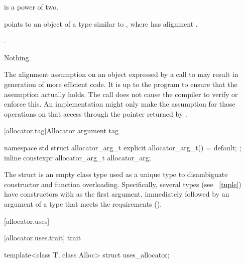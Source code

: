 \begin{itemdescr}
\pnum
\mandates
{} is a power of two.

\pnum
\expects
{} points to an object  of
a type similar to ,
where  has alignment .

\pnum
\returns
{}.

\pnum
\throws
Nothing.

\pnum
\begin{note}
The alignment assumption on an object 
expressed by a call to 
may result in generation of more efficient code.
It is up to the program to ensure that the assumption actually holds.
The call does not cause the compiler to verify or enforce this.
An implementation might only make the assumption
for those operations on  that access 
through the pointer returned by .
\end{note}
\end{itemdescr}

[allocator.tag]{Allocator argument tag}

%
%
\begin{itemdecl}
namespace std {
  struct allocator_arg_t { explicit allocator_arg_t() = default; };
  inline constexpr allocator_arg_t allocator_arg{};
}
\end{itemdecl}

\pnum
The  struct is an empty class type used as a unique type to
disambiguate constructor and function overloading. Specifically, several types (see
~\ref{tuple}) have constructors with  as the first
argument, immediately followed by an argument of a type that meets the
 requirements ().

[allocator.uses]{}

[allocator.uses.trait]{ trait}

%
\begin{itemdecl}
template<class T, class Alloc> struct uses_allocator;
\end{itemdecl}

